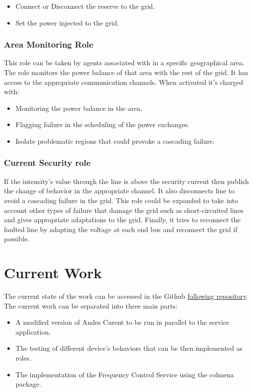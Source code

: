 \documentclass{article}
\begin{document}
\begin{itemize}
    \item Connect or Disconnect the reserve to the grid.
    \item Set the power injected to the grid.
\end{itemize}

\subsubsection*{Area Monitoring Role}

This role can be taken by agents associated with in a specific geographical area. The role monitors the power balance of that area with the rest of the grid. It has access to the appropriate communication channels. When activated it's charged with:
\begin{itemize}
    \item Monitoring the power balance in the area. 
    \item Flagging failure in the scheduling of the power exchanges.
    \item Isolate problematic regions that could provoke a cascading failure.
\end{itemize}

\subsubsection*{Current Security role}
If the intensity's value through the line is above the security current then publish the change of behavior in the appropriate channel. It also disconnects line to avoid a cascading failure in the grid. This role could be expanded to take into account other types of failure that damage the grid such as short-circuited lines and gives appropriate adaptations to the grid. Finally, it tries to reconnect the faulted line by adapting the voltage at each end bus
and reconnect the grid if possible.


\section{Current Work}

The current state of the work can be accessed in the Github \href{https://github.com/eRoots-Analytics/COLMENA}{following repository}. The current work can be separated into three main parts:

\begin{itemize}
    \item A modified version of Andes Curent to be run in parallel to the service application.
    \item The testing of different device's behaviors that can be then implemented as roles.
    \item The implementation of the Frequency Control Service using the colmena package.
\end{itemize}
\end{document}
